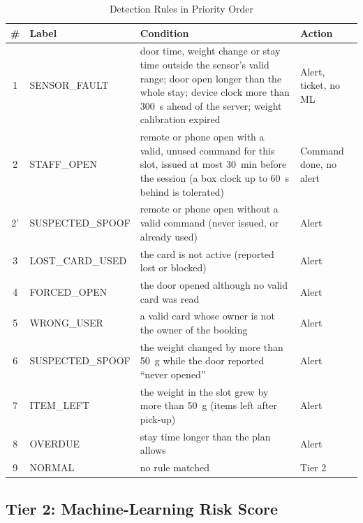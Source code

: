 \begin{table}[!htbp]\renewcommand{\arraystretch}{0.88}
\renewcommand{\arraystretch}{1.0}
\centering
\small
\caption{Detection Rules in Priority Order}
\label{tab:rules}
\footnotesize
\begin{tabular}{c l p{8.4cm} l}
\hline
\# & Label & Condition & Action \\
\hline
1 & SENSOR\_FAULT & door time, weight change or stay time outside the sensor's valid range; door open longer than the whole stay; device clock more than 300~s ahead of the server; weight calibration expired & Alert, ticket, no ML \\
2 & STAFF\_OPEN & remote or phone open with a valid, unused command for this slot, issued at most 30~min before the session (a box clock up to 60~s behind is tolerated) & Command done, no alert \\
2' & SUSPECTED\_SPOOF & remote or phone open without a valid command (never issued, or already used) & Alert \\
3 & LOST\_CARD\_USED & the card is not active (reported lost or blocked) & Alert \\
4 & FORCED\_OPEN & the door opened although no valid card was read & Alert \\
5 & WRONG\_USER & a valid card whose owner is not the owner of the booking & Alert \\
6 & SUSPECTED\_SPOOF & the weight changed by more than 50~g while the door reported ``never opened'' & Alert \\
7 & ITEM\_LEFT & the weight in the slot grew by more than 50~g (items left after pick-up) & Alert \\
8 & OVERDUE & stay time longer than the plan allows & Alert \\
9 & NORMAL & no rule matched & Tier 2 \\
\hline
\end{tabular}
\end{table}

\subsection{Tier 2: Machine-Learning Risk Score}

